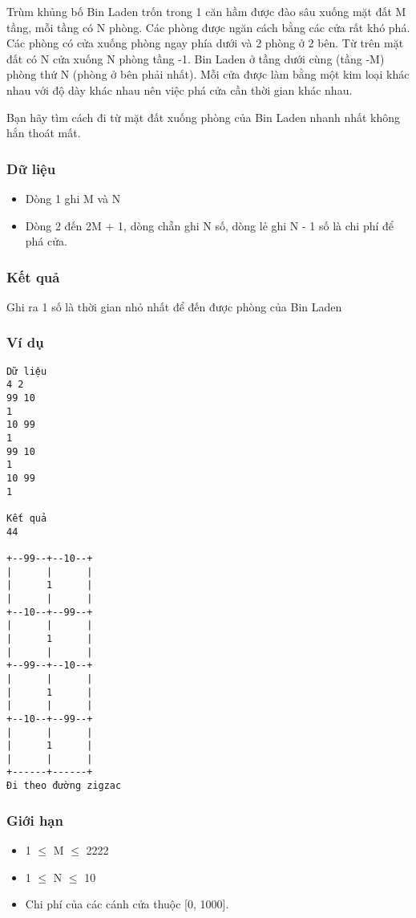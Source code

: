 

Trùm khủng bố Bin Laden trốn trong 1 căn hầm được đào sâu xuống mặt đất M tầng, mỗi tầng có N phòng. Các phòng được ngăn cách bằng các cửa rất khó phá. Các phòng có cửa xuống phòng ngay phía dưới và 2 phòng ở 2 bên. Từ trên mặt đất có N cửa xuống N phòng tầng -1. Bin Laden ở tầng dưới cùng (tầng -M) phòng thứ N (phòng ở bên phải nhất). Mỗi cửa được làm bằng một kim loại khác nhau với độ dày khác nhau nên việc phá cửa cần thời gian khác nhau.

Bạn hãy tìm cách đi từ mặt đất xuống phòng của Bin Laden nhanh nhất không hắn thoát mất.

\subsubsection{Dữ liệu}
\begin{itemize}
	\item Dòng 1 ghi M và N
	\item Dòng 2 đến 2M + 1, dòng chẵn ghi N số, dòng lẻ ghi N - 1 số là chi phí để phá cửa.
\end{itemize}

\subsubsection{Kết quả}

Ghi ra 1 số là thời gian nhỏ nhất để đến được phòng của Bin Laden

\subsubsection{Ví dụ}
\begin{verbatim}
Dữ liệu
4 2
99 10
1
10 99
1
99 10
1
10 99
1

Kết quả
44

+--99--+--10--+
|      |      |
|      1      |
|      |      |
+--10--+--99--+
|      |      |
|      1      |
|      |      |
+--99--+--10--+
|      |      |
|      1      |
|      |      |
+--10--+--99--+
|      |      |
|      1      |
|      |      |
+------+------+
Đi theo đường zigzac
\end{verbatim}

\subsubsection{Giới hạn}
\begin{itemize}
	\item 1  $\le$  M  $\le$  2222
	\item 1  $\le$  N  $\le$  10
	\item Chi phí của các cánh cửa thuộc [0, 1000].
\end{itemize}
